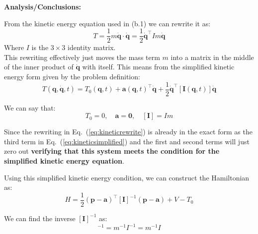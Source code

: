 \documentclass[titlepage]{article}
\begin{document}
\textbf{Analysis/Conclusions:}\\

\begin{mdframed}[linewidth=1pt, innertopmargin=10pt, innerbottommargin=10pt]
	From the kinetic energy equation used in (b.1) we can rewrite it as:
	\begin{equation}
		T=\frac{1}{2}m\dot{\boldsymbol{q}}\cdot\dot{\boldsymbol{q}}=\frac{1}{2}\dot{\boldsymbol{q}}^\top Im\dot{\boldsymbol{q}}
		\label{eq:kineticrewrite}
	\end{equation}
	Where $I$ is the $3\times3$ identity matrix. \\
	
	This rewriting effectively just moves the mass term $m$ into a matrix in the middle of the inner product of $\dot{\boldsymbol{q}}$ with itself. This means from the simplified kinetic energy form given by the problem definition:
	\begin{equation}
		T(\boldsymbol{q},\dot{\boldsymbol{q}},t)=T_0(\boldsymbol{q},t)+\boldsymbol{a}(\boldsymbol{q},t)^\top\dot{\boldsymbol{q}}+\frac{1}{2}\dot{\boldsymbol{q}}^\top[\boldsymbol{I}(\boldsymbol{q},t)]\dot{\boldsymbol{q}}
		\label{eq:kineticsimplified}
	\end{equation}
	
	We can say that:
	\begin{equation}
		T_0=0,\quad\boldsymbol{a}=\boldsymbol{0},\quad[\boldsymbol{I}]=Im
	\end{equation}
	
	Since the rewriting in Eq.~(\ref{eq:kineticrewrite}) is already in the exact form as the third term in Eq.~(\ref{eq:kineticsimplified}) and the first and second terms will just zero out \textbf{verifying that this system meets the condition for the simplified kinetic energy equation}.
\end{mdframed}

Using this simplified kinetic energy condition, we can construct the Hamiltonian as:
\begin{equation}
	H=\frac{1}{2}(\boldsymbol{p}-\boldsymbol{a})^\top[\boldsymbol{I}]^{-1}(\boldsymbol{p}-\boldsymbol{a})+V-T_0
	\label{eq:hamiltoniansimplified}
\end{equation}

We can find the inverse $[\boldsymbol{I}]^{-1}$ as:
\begin{equation}
	[\boldsymbol{I}]^{-1}=m^{-1}I^{-1}=m^{-1}I
\end{equation}

\newpage
\end{document}
